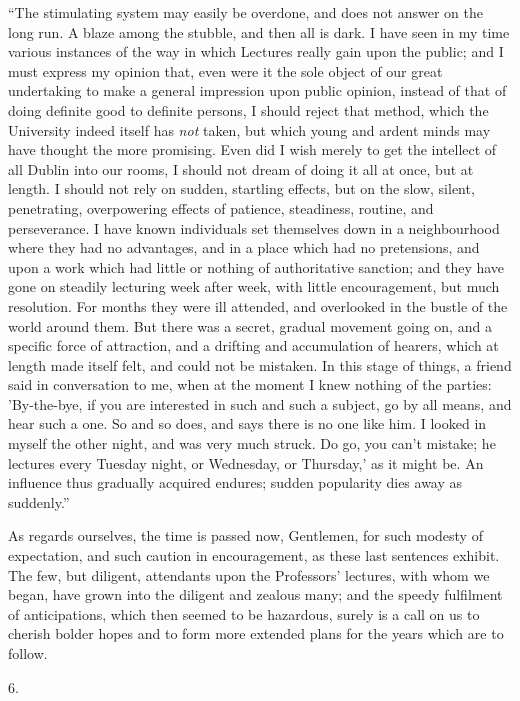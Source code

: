 ``The stimulating system may easily be overdone, and does not
answer on the long run. A blaze among the stubble, and then all is
dark. I have seen in my time various instances of the way in which
Lectures really gain upon the public; and I must express my opinion
that, even were it the sole object of our great undertaking to make a
general impression upon public opinion, instead of that of doing
definite good to definite persons, I should reject that method, which
the University indeed itself has \emph{not} taken, but which young and
ardent minds may have thought the more promising. Even did I wish
merely to get the intellect of all Dublin into our rooms, I should not
dream of doing it all at once, but at length. I should not rely on
sudden, startling effects, but on the slow, silent, penetrating,
overpowering effects of patience, steadiness, routine, and
perseverance. I have known individuals set themselves down in a
neighbourhood where they had no advantages, and in a place which had
no pretensions, and upon a work which had little or nothing of
authoritative sanction; and they have gone on steadily lecturing week
after week, with little encouragement, but much resolution. For months
they were ill attended, and overlooked in the bustle of the world
around them. But there was a secret, gradual movement going on, and a
specific force of attraction, and a drifting and accumulation of
hearers, which at length made itself felt, and could not be mistaken.
In this stage of things, a friend said in conversation to me,
when at the moment I knew nothing of the parties: 'By-the-bye, if you
are interested in such and such a subject, go by all means, and hear
such a one. So and so does, and says there is no one like him. I
looked in myself the other night, and was very much struck. Do go, you
can't mistake; he lectures every Tuesday night, or Wednesday, or
Thursday,' as it might be. An influence thus gradually acquired
endures; sudden popularity dies away as suddenly.''

As regards ourselves, the time is passed now, Gentlemen, for such
modesty of expectation, and such caution in encouragement, as these
last sentences exhibit. The few, but diligent, attendants upon the
Professors' lectures, with whom we began, have grown into the diligent
and zealous many; and the speedy fulfilment of anticipations, which
then seemed to be hazardous, surely is a call on us to cherish bolder
hopes and to form more extended plans for the years which are to
follow.

6.

